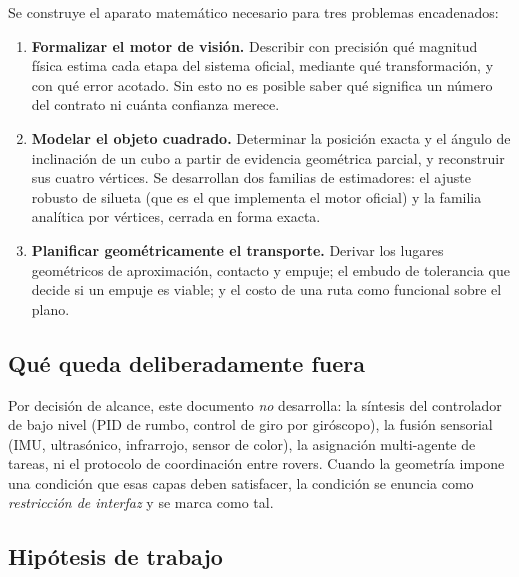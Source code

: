 \documentclass[11pt,a4paper]{article}
\theoremstyle{definition}
\begin{document}
Se construye el aparato matemático necesario para tres problemas encadenados:

\begin{enumerate}[label=(\Roman*),leftmargin=2.2em]
\item \textbf{Formalizar el motor de visión.} Describir con precisión qué magnitud
      física estima cada etapa del sistema oficial, mediante qué transformación, y
      con qué error acotado. Sin esto no es posible saber qué significa un número
      del contrato ni cuánta confianza merece.
\item \textbf{Modelar el objeto cuadrado.} Determinar la posición exacta y el ángulo
      de inclinación de un cubo a partir de evidencia geométrica parcial, y
      reconstruir sus cuatro vértices. Se desarrollan dos familias de estimadores:
      el ajuste robusto de silueta (que es el que implementa el motor oficial) y la
      familia analítica por vértices, cerrada en forma exacta.
\item \textbf{Planificar geométricamente el transporte.} Derivar los lugares
      geométricos de aproximación, contacto y empuje; el embudo de tolerancia que
      decide si un empuje es viable; y el costo de una ruta como funcional sobre el
      plano.
\end{enumerate}

\subsection{Qué queda deliberadamente fuera}

Por decisión de alcance, este documento \emph{no} desarrolla: la síntesis del
controlador de bajo nivel (PID de rumbo, control de giro por giróscopo), la fusión
sensorial (IMU, ultrasónico, infrarrojo, sensor de color), la asignación
multi-agente de tareas, ni el protocolo de coordinación entre rovers. Cuando la
geometría impone una condición que esas capas deben satisfacer, la condición se
enuncia como \emph{restricción de interfaz} y se marca como tal.

\subsection{Hipótesis de trabajo}
\label{sec:hipotesis}
\end{document}
